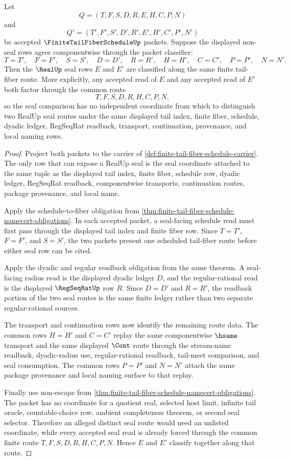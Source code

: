 \begin{lemma}
\label{lem:finite-tail-fiber-schedule-seal-route-determinacy}
Let
$$
Q=(T,F,S,D,R,E,H,C,P,N)
$$
and
$$
Q'=(T',F',S',D',R',E',H',C',P',N')
$$
be accepted $\FiniteTailFiberScheduleUp$ packets. Suppose the displayed non-seal rows agree componentwise through the packet classifier:
$$
T=T',\quad F=F',\quad S=S',\quad D=D',\quad R=R',\quad H=H',\quad C=C',\quad P=P',\quad N=N'.
$$
Then the $\RealUp$ seal rows $E$ and $E'$ are classified along the same finite tail-fiber route. More explicitly, any accepted read of $E$ and any accepted read of $E'$ both factor through the common route
$$
T,F,S,D,R,H,C,P,N,
$$
so the seal comparison has no independent coordinate from which to distinguish two RealUp seal routes under the same displayed tail index, finite fiber, schedule, dyadic ledger, RegSeqRat readback, transport, continuation, provenance, and local naming rows.
\end{lemma}
\begin{proof}
Project both packets to the carrier of \autoref{def:finite-tail-fiber-schedule-carrier}. The only row that can expose a RealUp seal is the seal coordinate attached to the same tuple as the displayed tail index, finite fiber, schedule row, dyadic ledger, RegSeqRat readback, componentwise transports, continuation routes, package provenance, and local name.

Apply the schedule-to-fiber obligation from \autoref{thm:finite-tail-fiber-schedule-namecert-obligations}. In each accepted packet, a seal-facing schedule read must first pass through the displayed tail index and finite fiber row. Since $T=T'$, $F=F'$, and $S=S'$, the two packets present one scheduled tail-fiber route before either seal row can be cited.

Apply the dyadic and regular readback obligation from the same theorem. A seal-facing radius read is the displayed dyadic ledger $D$, and the regular-rational read is the displayed $\RegSeqRatUp$ row $R$. Since $D=D'$ and $R=R'$, the readback portion of the two seal routes is the same finite ledger rather than two separate regular-rational sources.

The transport and continuation rows now identify the remaining route data. The common rows $H=H'$ and $C=C'$ replay the same componentwise $\hsame$ transport and the same displayed $\Cont$ route through the stream-name readback, dyadic-radius use, regular-rational readback, tail-meet comparison, and seal consumption. The common rows $P=P'$ and $N=N'$ attach the same package provenance and local naming surface to that replay.

Finally use non-escape from \autoref{thm:finite-tail-fiber-schedule-namecert-obligations}. The packet has no coordinate for a quotient real, selected host limit, infinite tail oracle, countable-choice row, ambient completeness theorem, or second seal selector. Therefore an alleged distinct seal route would need an unlisted coordinate, while every accepted seal read is already forced through the common finite route $T,F,S,D,R,H,C,P,N$. Hence $E$ and $E'$ classify together along that route.
\end{proof}
